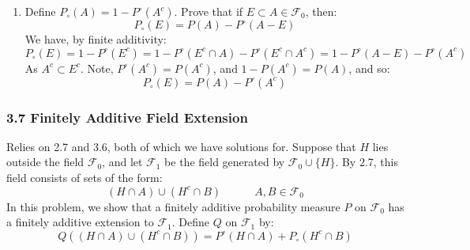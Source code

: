 \documentclass[12pt,a4paper]{article}
\newcommand{\1}[1]{\mathbbm{1}\left\{ #1 \right\}}
\newcommand{\fcal}{\mathcal{F}}
\begin{document}
\begin{enumerate}
	\item Define $P_\circ(A) = 1 - P^\circ(A^c)$. Prove that if $E \subset A \in \fcal_0$, then:
	$$
		P_\circ(E) = P(A) - P^\circ(A - E)
	$$
	We have, by finite additivity:
	$$
		P_\circ(E) = 1 - P^\circ(E^c) = 1 - P^\circ(E^c \cap A) - P^\circ(E^c \cap A^c) =
		1 - P^\circ(A - E) - P^\circ(A^c)
	$$
	As $A^c \subset E^c$. Note, $P^\circ(A^c) = P(A^c)$, and $1 - P(A^c) = P(A)$, and so:
	$$
		P_\circ(E) = P(A) - P^\circ(A^c)
	$$
\end{enumerate}

\subsubsection{3.7 Finitely Additive Field Extension} Relies on 2.7 and 3.6, both of which we have solutions for. Suppose that $H$ lies outside the field $\fcal_0$, and let $\fcal_1$ be the field generated by $\fcal_0 \cup \{H\}$. By 2.7, this field consists of sets of the form:
$$
	(H \cap A) \cup (H^c \cap B) \quad\quad\quad A,B \in \fcal_0
$$
In this problem, we show that a finitely additive probability measure $P$ on $\fcal_0$ has a finitely additive extension to $\fcal_1$. Define $Q$ on $\fcal_1$ by:
$$
	Q((H \cap A) \cup (H^c \cap B)) = P^\circ(H \cap A) + P_\circ(H^c \cap B)
$$
\end{document}
